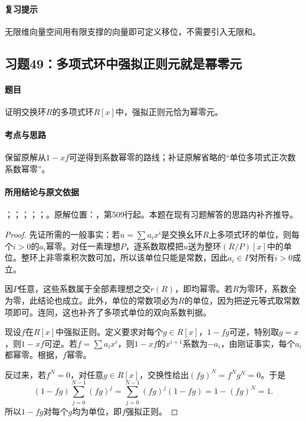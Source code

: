 \paragraph{复习提示}

无限维向量空间用有限支撑的向量即可定义移位，不需要引入无限和。



\subsection{习题49：多项式环中强拟正则元就是幂零元}

\label{ex:3:49}

\paragraph{题目}

证明交换环$R$的多项式环$R[x]$中，强拟正则元恰为幂零元。

\paragraph{考点与思路}

保留原解从$1-xf$可逆得到系数幂零的路线；补证原解省略的“单位多项式正次数系数幂零”。

\paragraph{所用结论与原文依据}

；；；；；。原解位置：，第509行起。本题在现有习题解答的思路内补齐推导。


\begin{proof}

先证所需的一般事实：若$u=\sum a_ix^i$是交换幺环$R$上多项式环的单位，则每个$i>0$的$a_i$幂零。对任一素理想$P$，逐系数取模把$u$送为整环$(R/P)[x]$中的单位。整环上非零乘积次数可加，所以该单位只能是常数，因此$a_i\in P$对所有$i>0$成立。

因$P$任意，这些系数属于全部素理想之交$r(R)$，即均幂零。若$R$为零环，系数全为零，此结论也成立。此外，单位的常数项必为$R$的单位，因为把逆元等式取常数项即可。连同，这也补齐了多项式单位的双向系数判据。

现设$f$在$R[x]$中强拟正则。定义要求对每个$g\in R[x]$，$1-fg$可逆，特别取$g=x$，则$1-xf$可逆。若$f=\sum a_ix^i$，则$1-xf$的$x^{i+1}$系数为$-a_i$，由刚证事实，每个$a_i$都幂零。根据，$f$幂零。

反过来，若$f^N=0$，对任意$g\in R[x]$，交换性给出$(fg)^N=f^Ng^N=0$。于是
\[
(1-fg)\sum_{j=0}^{N-1}(fg)^j
=\sum_{j=0}^{N-1}(fg)^j(1-fg)=1-(fg)^N=1.
\]
所以$1-fg$对每个$g$均为单位，即$f$强拟正则。

\end{proof}

